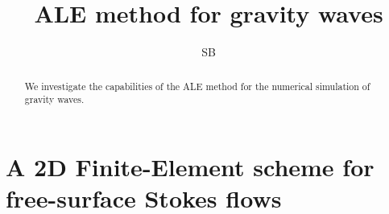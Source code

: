 \documentclass{article}
\theoremstyle{plain}
\numberwithin{equation}{section} %
\begin{document}
\title{ALE method for gravity waves}


\author{SB
}


\maketitle

\begin{abstract}
We investigate the capabilities of the ALE method for the numerical simulation of gravity waves.
\end{abstract}





\section{A 2D Finite-Element scheme for free-surface Stokes flows}
\end{document}

